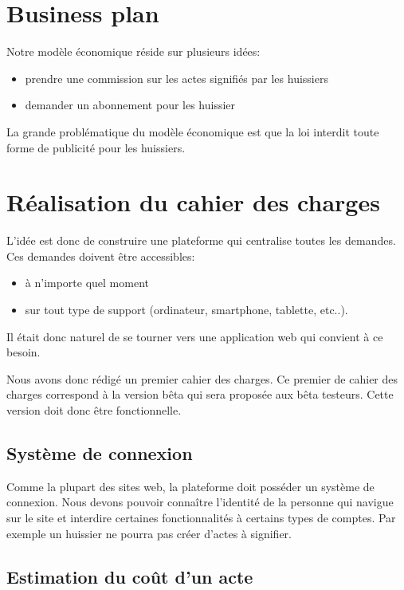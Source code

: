 \documentclass[]{report}
\begin{document}
  \section{Business plan}

    Notre modèle économique réside sur plusieurs idées:

    \begin{itemize}
      \item prendre une commission sur les actes signifiés par les huissiers
      \item demander un abonnement pour les huissier
    \end{itemize}

    La grande problématique du modèle économique est que la loi interdit toute forme de publicité pour les huissiers.

  \section{Réalisation du cahier des charges}

    L'idée est donc de construire une plateforme qui centralise toutes les demandes. Ces demandes doivent être accessibles:

    \begin{itemize}
      \item à n'importe quel moment
      \item sur tout type de support (ordinateur, smartphone, tablette, etc..).
    \end{itemize}

    Il était donc naturel de se tourner vers une application web qui convient à ce besoin.

    Nous avons donc rédigé un premier cahier des charges. Ce premier de cahier des charges correspond à la version bêta qui sera proposée aux bêta testeurs. Cette version doit donc être fonctionnelle.

    \subsection{Système de connexion}

      Comme la plupart des sites web, la plateforme doit posséder un système de connexion. Nous devons pouvoir connaître l’identité de la personne qui navigue sur le site et interdire certaines fonctionnalités à certains types de comptes. Par exemple un huissier ne pourra pas créer d'actes à signifier.

    \subsection{Estimation du coût d'un acte}
\end{document}
